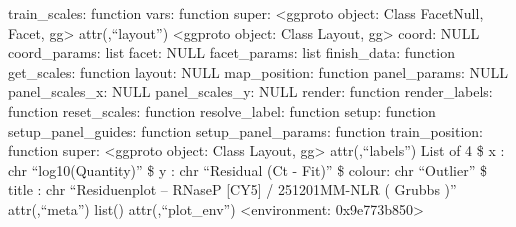 \documentclass[
]{article}
\begin{document}
train\_scales: function vars: function super: \textless ggproto object:
Class FacetNull, Facet, gg\textgreater{} attr(,``layout'')
\textless ggproto object: Class Layout, gg\textgreater{} coord: NULL
coord\_params: list facet: NULL facet\_params: list finish\_data:
function get\_scales: function layout: NULL map\_position: function
panel\_params: NULL panel\_scales\_x: NULL panel\_scales\_y: NULL
render: function render\_labels: function reset\_scales: function
resolve\_label: function setup: function setup\_panel\_guides: function
setup\_panel\_params: function train\_position: function super:
\textless ggproto object: Class Layout, gg\textgreater{}
attr(,``labels'') List of 4 \$ x : chr ``log10(Quantity)'' \$ y : chr
``Residual (Ct - Fit)'' \$ colour: chr ``Outlier'' \$ title : chr
``Residuenplot -- RNaseP {[}CY5{]} / 251201MM-NLR ( Grubbs )''
attr(,``meta'') list() attr(,``plot\_env'') \textless environment:
0x9e773b850\textgreater{} \n
\end{document}
